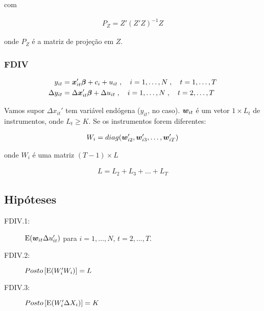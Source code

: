 \documentclass[11pt, oneside, a4paper, article]{article}
\numberwithin{equation}{section}
\begin{document}
\begin{description}
\begin{description}
\noindent
com

\vspace{-1 em}
\begin{align*}
\boxed{P_{Z} = Z'(Z'Z)^{-1}Z }
\end{align*}

\noindent
onde
$P_{Z}$ é a matriz de projeção em $Z$.

\subsubsection*{FDIV}

\vspace{-1 em}
\begin{align*}
y_{it} &= \boldsymbol{x}_{it}' \boldsymbol{\beta} + c_{i} + u_{it}
\; , \quad i = 1, \dots, N
\; , \quad t = 1, \dots, T
\\
\Delta y_{it} &= \Delta \boldsymbol{x}_{it}' \boldsymbol{\beta} + \Delta u_{it}
\; , \quad i = 1, \dots, N
\; , \quad t = 2, \dots, T
\end{align*}

Vamos supor $\Delta x_{it}'$ tem variável endógena ($y_{it}$, no caso).
$\boldsymbol{w}_{it}$ é um vetor $1 \times L_{t}$ de instrumentos, onde $L_{t} \geq K$.
Se os instrumentos forem diferentes:

\vspace{-1 em}
\begin{align*}
	W_{i} = diag( \boldsymbol{w}_{i2}', \boldsymbol{w}_{i3}', \dots, \boldsymbol{w}_{iT}')
\end{align*}

\noindent
onde $W_{i}$ é uma matriz $( T - 1 ) \times L$

\vspace{-1 em}
\begin{align*}
	L = L_{2} + L_{3} + \dots + L_{T}
\end{align*}

\subsection*{Hipóteses}

\begin{description}
\item[FDIV.1:] $\text{E}( \boldsymbol{w}_{it} \Delta u_{it}')$ para $i = 1, \dots, N$, $t = 2, \dots, T$.
\item[FDIV.2:] $Posto\left[ \text{E}( W_{i}' W_{i} ) \right] = L$
\item[FDIV.3:] $Posto\left[ \text{E}( W_{i}' \Delta X_{i} ) \right] = K$
\end{description}


\end{description}
\end{description}
\end{document}
